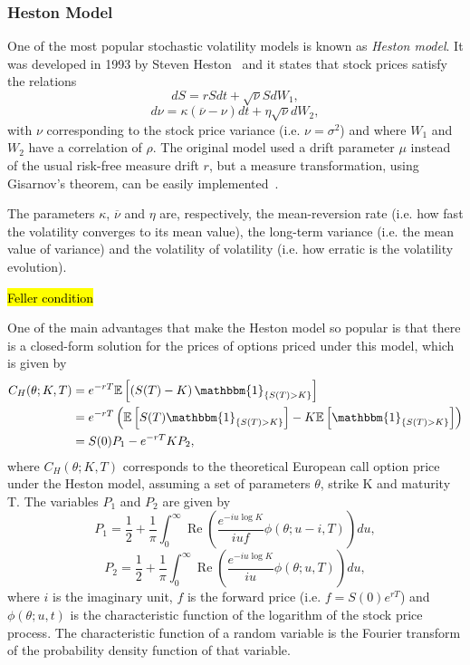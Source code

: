 \subsubsection{Heston Model}
One of the most popular stochastic volatility models is known as \emph{Heston model}. It was developed in 1993 by Steven Heston~\cite{Heston} and it states that stock prices satisfy the relations
\begin{equation}
dS=rSdt+\sqrt{\nu}SdW_1,
\end{equation}
\begin{equation}
d\nu=\kappa(\overline{\nu}-\nu)dt+\eta\sqrt{\nu}dW_2,
\end{equation}
\noindent with $\nu$ corresponding to the stock price variance (i.e. $\nu=\sigma^2$) and where $W_1$ and $W_2$ have a correlation of $\rho$. The original model used a drift parameter $\mu$ instead of the usual risk-free measure drift $r$, but a measure transformation, using Gisarnov's theorem, can be easily implemented~\cite{Crisostomo}.

The parameters $\kappa$, $\overline{\nu}$ and $\eta$ are, respectively, the mean-reversion rate (i.e. how fast the volatility converges to its mean value), the long-term variance (i.e. the mean value of variance) and the volatility of volatility (i.e. how erratic is the volatility evolution).

\hl{Feller condition}

One of the main advantages that make the Heston model so popular is that there is a closed-form solution for the prices of options priced under this model, which is given by
\begin{equation}\label{CH}
\begin{split}
C_{H}(\theta;K,T)&=e^{-rT}\mathbb{E}\left[\left(S(T)-K\right)\mathbbm{1}_{\left\{S(T)>K\right\}}\right]\\
&=e^{-rT}\left(\mathbb{E}\left[S(T)\mathbbm{1}_{\left\{S(T)>K\right\}}\right]-K\mathbb{E}\left[\mathbbm{1}_{\left\{S(T)>K\right\}}\right]\right)\\
&=S(0)P_1-e^{-rT}KP_2,
\end{split}
\end{equation}
\noindent where $C_{H}(\theta;K,T)$ corresponds to the theoretical European call option price under the Heston model, assuming a set of parameters $\theta$, strike K and maturity T. The variables $P_1$ and $P_2$ are given by
\begin{equation}\label{P1}
P_1=\frac{1}{2}+\frac{1}{\pi}\int_0^\infty\operatorname{Re}\left(\frac{e^{-iu\log K}}{iuf}\phi(\theta;u-i,T)\right)du,
\end{equation}
\begin{equation}\label{P2}
P_2=\frac{1}{2}+\frac{1}{\pi}\int_0^\infty\operatorname{Re}\left(\frac{e^{-iu\log K}}{iu}\phi(\theta;u,T)\right)du,
\end{equation}
\noindent where $i$ is the imaginary unit, $f$ is the forward price (i.e. $f=S(0)e^{rT}$) and $\phi(\theta;u,t)$ is the characteristic function of the logarithm of the stock price process. The characteristic function of a random variable is the Fourier transform of the probability density function of that variable.

